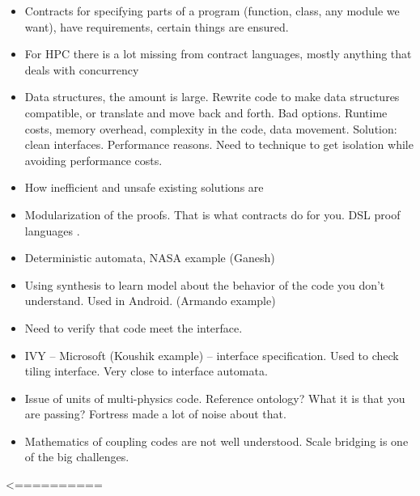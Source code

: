 { 
\begin{itemize}
\item Contracts for specifying parts of a program (function, class, any module we want), have requirements, certain things are ensured.

\item For HPC there is a lot missing from contract languages, mostly anything that deals with concurrency

\item Data structures, the amount is large. Rewrite code to make data structures compatible, or translate and move back and forth. Bad options. Runtime costs, memory overhead, complexity in the code, data movement. Solution: clean interfaces. Performance reasons. Need to technique to get isolation while avoiding performance costs. 

\item How inefficient and unsafe existing solutions are


\item Modularization of the proofs. That is what contracts do for you. DSL proof languages . 

\item Deterministic automata, NASA example (Ganesh)

\item Using synthesis to learn model about the behavior of the code you don’t understand.  Used in Android. (Armando example)

\item Need to verify that code meet the interface. 

\item IVY – Microsoft (Koushik example) – interface specification. Used to check tiling interface. Very close to interface automata. 

\item Issue of units of multi-physics code. Reference ontology? What it is that you are passing?  Fortress made a lot of noise about that. 

\item Mathematics of coupling codes are not well understood. Scale bridging is one of the big challenges. 

\end{itemize}


<==========}
